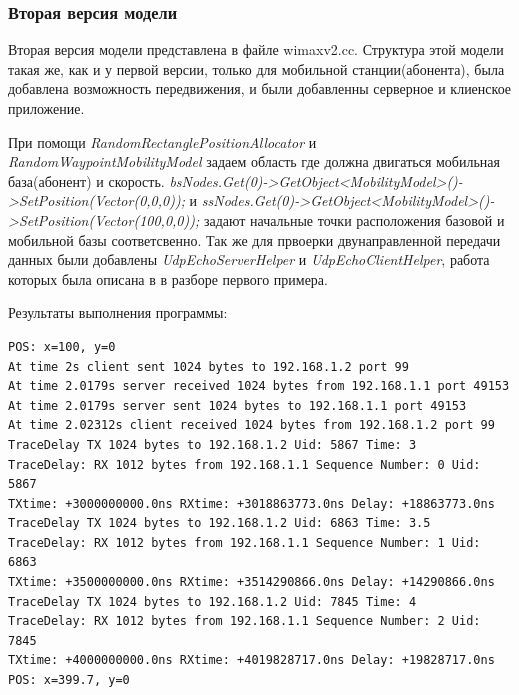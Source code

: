\documentclass[14pt,a4paper]{article}
\begin{document}
\subsubsection{Вторая версия модели}
Вторая версия модели представлена в файле wimaxv2.cc. Структура этой модели
такая же, как и у первой версии, только для мобильной станции(абонента), была
добавлена возможность передвижения, и были добавленны серверное и клиенское
приложение.

При помощи \textit{RandomRectanglePositionAllocator} и
\textit{RandomWaypointMobilityModel} задаем область где должна двигаться
мобильная база(абонент) и скорость.
\textit{bsNodes.Get(0)->GetObject<MobilityModel>()->SetPosition(Vector(0,0,0));}
и
\textit{ssNodes.Get(0)->GetObject<MobilityModel>()->SetPosition(Vector(100,0,0));}
задают начальные точки расположения  базовой и мобильной базы соответсвенно. Так
же для првоерки двунаправленной передачи данных были добавлены
\textit{UdpEchoServerHelper} и \textit{UdpEchoClientHelper}, работа которых была
описана в в разборе первого примера.

\vspace{1cm}
Результаты выполнения программы:
\begin{verbatim}
POS: x=100, y=0
At time 2s client sent 1024 bytes to 192.168.1.2 port 99
At time 2.0179s server received 1024 bytes from 192.168.1.1 port 49153
At time 2.0179s server sent 1024 bytes to 192.168.1.1 port 49153
At time 2.02312s client received 1024 bytes from 192.168.1.2 port 99
TraceDelay TX 1024 bytes to 192.168.1.2 Uid: 5867 Time: 3
TraceDelay: RX 1012 bytes from 192.168.1.1 Sequence Number: 0 Uid: 5867 
TXtime: +3000000000.0ns RXtime: +3018863773.0ns Delay: +18863773.0ns
TraceDelay TX 1024 bytes to 192.168.1.2 Uid: 6863 Time: 3.5
TraceDelay: RX 1012 bytes from 192.168.1.1 Sequence Number: 1 Uid: 6863 
TXtime: +3500000000.0ns RXtime: +3514290866.0ns Delay: +14290866.0ns
TraceDelay TX 1024 bytes to 192.168.1.2 Uid: 7845 Time: 4
TraceDelay: RX 1012 bytes from 192.168.1.1 Sequence Number: 2 Uid: 7845 
TXtime: +4000000000.0ns RXtime: +4019828717.0ns Delay: +19828717.0ns
POS: x=399.7, y=0
\end{verbatim}


\newpage
{}

\end{document}
